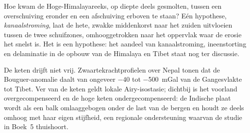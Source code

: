 \begin{omfigure}
\par{}
\end{omfigure}

Hoe kwam de Hoge-Himalayareeks, op diepte deels gesmolten, tussen een
overschuiving eronder en een afschuiving erboven te staan? Eén hypothese, \emph{kanaalstroming}, laat de hete,
zwakke middenkorst naar het zuiden uitvloeien tussen de twee schuifzones, omhooggetrokken naar het
oppervlak waar de erosie het snelst is. Het is een hypothese: het aandeel van kanaalstroming, ineenstorting
en delaminatie in de opbouw van de Himalaya en Tibet staat nog ter discussie.

De keten drijft niet vrij. Zwaartekrachtprofielen over Nepal tonen dat de Bouguer-anomalie
daalt van ongeveer $-40$ tot \qty{-500}{mGal} van de Gangesvlakte tot Tibet. Ver van de
keten geldt lokale Airy-isostasie; dichtbij is het voorland overgecompenseerd en de hoge
keten ondergecompenseerd: de Indische plaat wordt als een balk omlaaggebogen onder de last van de
bergen en houdt ze deels omhoog met haar eigen stijfheid, een regionale ondersteuning waarvan de studie
in Boek~5 thuishoort.

